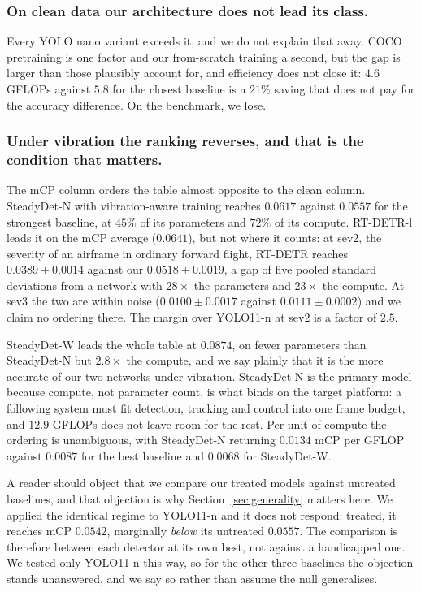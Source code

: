 \subsubsection{On clean data our architecture does not lead its class.}
Every YOLO nano variant exceeds it, and we do not explain that away. COCO
pretraining is one factor and our from-scratch training a second, but the gap is
larger than those plausibly account for, and efficiency does not close it: $4.6$
GFLOPs against $5.8$ for the closest baseline is a $21\%$ saving that does not pay
for the accuracy difference. On the benchmark, we lose.

\subsubsection{Under vibration the ranking reverses, and that is the condition that matters.}
The mCP column orders the table almost opposite to the clean column. SteadyDet-N
with vibration-aware training reaches $0.0617$ against $0.0557$ for the strongest
baseline, at $45\%$ of its parameters and $72\%$ of its compute. RT-DETR-l leads it
on the mCP average ($0.0641$), but not where it counts: at sev2, the severity of an
airframe in ordinary forward flight, RT-DETR reaches $0.0389 \pm 0.0014$ against our
$0.0518 \pm 0.0019$, a gap of five pooled standard deviations from a network with
$28\times$ the parameters and $23\times$ the compute. At sev3 the two are within
noise ($0.0100 \pm 0.0017$ against $0.0111 \pm 0.0002$) and we claim no ordering
there. The margin over YOLO11-n at sev2 is a factor of $2.5$.

SteadyDet-W leads the whole table at $0.0874$, on fewer parameters than SteadyDet-N
but $2.8\times$ the compute, and we say plainly that it is the more accurate of our
two networks under vibration. SteadyDet-N is the primary model because compute, not
parameter count, is what binds on the target platform: a following system must fit
detection, tracking and control into one frame budget, and $12.9$ GFLOPs does not
leave room for the rest. Per unit of compute the ordering is unambiguous, with
SteadyDet-N returning $0.0134$ mCP per GFLOP against $0.0087$ for the best baseline
and $0.0068$ for SteadyDet-W.

A reader should object that we compare our treated models against untreated
baselines, and that objection is why Section~\ref{sec:generality} matters here. We
applied the identical regime to YOLO11-n and it does not respond: treated, it
reaches mCP $0.0542$, marginally \emph{below} its untreated $0.0557$. The
comparison is therefore between each detector at its own best, not against a
handicapped one. We tested only YOLO11-n this way, so for the other three baselines
the objection stands unanswered, and we say so rather than assume the null
generalises.

